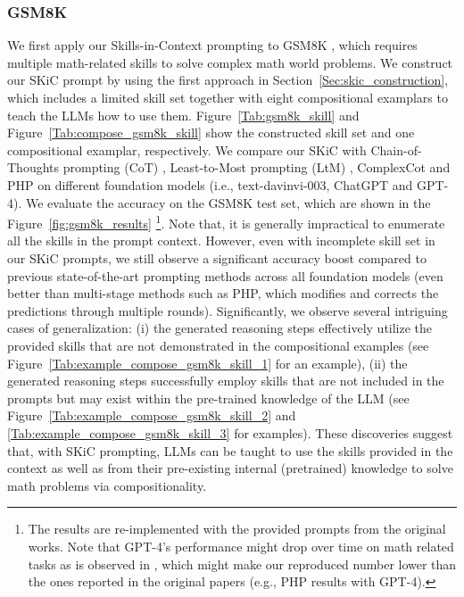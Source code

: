 \documentclass{article} \usepackage{arxiv}
\begin{document}
\subsubsection{GSM8K}
We first apply our Skills-in-Context prompting to GSM8K \citep{cobbe2021training}, which requires multiple math-related skills to solve complex math world problems. We construct our SKiC prompt by using the first approach in Section~\ref{Sec:skic_construction},
which includes a limited skill set together with eight compositional examplars to teach the LLMs how to use them. Figure~\ref{Tab:gsm8k_skill} and Figure~\ref{Tab:compose_gsm8k_skill} show the constructed skill set and one compositional examplar, respectively. We compare our SKiC with Chain-of-Thoughts prompting (CoT) \citep{wei2022chain}, Least-to-Most prompting (LtM) \citep{zhou2022least}, ComplexCot \citep{fu2022complexity} and PHP \citep{zheng2023progressive} on different foundation models (i.e., text-davinvi-003, ChatGPT and GPT-4). We evaluate the accuracy on the GSM8K test set, which are shown in the Figure~\ref{fig:gsm8k_results} \footnote{The results are re-implemented with the provided prompts from the original works. Note that GPT-4's performance might drop over time on math related tasks as is observed in \citet{chen2023chatgpts}, which might make our reproduced number lower than the ones reported in the original papers (e.g., PHP results with GPT-4).}. Note that, it is generally impractical to enumerate all the skills in the prompt context. However, even with incomplete skill set in our SKiC prompts, we still observe a significant accuracy boost compared to previous state-of-the-art prompting methods across all foundation models (even better than multi-stage methods such as PHP, which modifies and corrects the predictions through multiple rounds). Significantly, we observe several intriguing cases of generalization: (i) the generated reasoning steps effectively utilize the provided skills that are not demonstrated in the compositional examples (see Figure~\ref{Tab:example_compose_gsm8k_skill_1} for an example), (ii) the generated reasoning steps successfully employ skills that are not included in the prompts but may exist within the pre-trained knowledge of the LLM (see Figure~\ref{Tab:example_compose_gsm8k_skill_2} and \ref{Tab:example_compose_gsm8k_skill_3} for examples). These discoveries suggest that, with SKiC prompting, LLMs can be taught to use the skills provided in the context as well as from their pre-existing internal (pretrained) knowledge to solve math problems via compositionality. 
\end{document}
